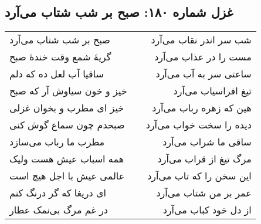 \begin{center}
\section*{غزل شماره ۱۸۰: صبح بر شب شتاب می‌آرد}
\label{sec:180}
\begin{longtable}{l p{0.5cm} r}
صبح بر شب شتاب می‌آرد
&&
شب سر اندر نقاب می‌آرد
\\
گریهٔ شمع وقت خندهٔ صبح
&&
مست را در عذاب می‌آرد
\\
ساقیا آب لعل ده که دلم
&&
ساعتی سر به آب می‌آرد
\\
خیز و خون سیاوش آر که صبح
&&
تیغ افراسیاب می‌آرد
\\
خیز ای مطرب و بخوان غزلی
&&
هین که زهره رباب می‌آرد
\\
صبحدم چون سماع گوش کنی
&&
دیده را سخت خواب می‌آرد
\\
مطرب ما رباب می‌سازد
&&
ساقی ما شراب می‌آرد
\\
همه اسباب عیش هست ولیک
&&
مرگ تیغ از قراب می‌آرد
\\
عالمی عیش با اجل هیچ است
&&
این سخن را که تاب می‌آرد
\\
ای دریغا که گر درنگ کنم
&&
عمر بر من شتاب می‌آرد
\\
در غم مرگ بی‌نمک عطار
&&
از دل خود کباب می‌آرد
\\
\end{longtable}
\end{center}
